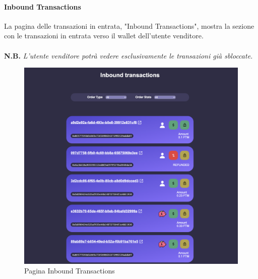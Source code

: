         \paragraph{Inbound Transactions}
        La pagina delle transazioni in entrata, "Inbound Transactions", mostra la sezione con le transazioni in entrata verso il wallet dell'utente venditore.\\\\
        \textbf{N.B.} \textit{L'utente venditore potrà vedere esclusivamente le transazioni già sbloccate.}\\
        \begin{figure}[H]
            \centering
            \includegraphics[scale=0.4]{immagini/Transaction/inboundTransactions.png}
            \caption{Pagina Inbound Transactions}
        \end{figure}
